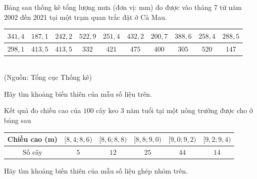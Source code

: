 \begin{bt}[Mức độ 1]%
	Bảng sau thống kê tổng lượng mưa (đơn vị: mm) đo được vào tháng 7 từ năm 2002 đến 2021 tại một trạm quan trắc đặt ở Cà Mau.
	\begin{center}
		\begin{tabular}{|c|c|c|c|c|c|c|c|c|c|}
			\hline
			$341{,}4$ & $187{,}1$ & $242{,}2$ & $522{,}9$ & $251{,}4$ & $432{,}2$ & $200{,}7$ & $388{,}6$ & $258{,}4$ & $288{,}5$ \\
			\hline
			$298{,}1$ & $413{,}5$ & $413{,}5$ & $332$ & $421$ & $475$ & $400$ & $305$ & $520$ & $147$ \\
			\hline
		\end{tabular}\\
		(Nguồn: Tổng cục Thống kê)
	\end{center}
	Hãy tìm khoảng biến thiên của mẫu số liệu trên.
\end{bt}

\begin{bt}[Mức độ 1]%
	Kết quả đo chiều cao của $100$ cây keo 3 năm tuổi tại một nông trường được cho ở bảng sau
	\begin{center}
		\begin{tabular}{|c|c|c|c|c|c|}
			\hline
			Chiều cao (m) & $[8{,}4;8{,}6)$ & $[8{,}6;8{,}8)$ & $[8{,}8;9{,}0)$ & $[9{,}0;9{,}2)$ & $[9{,}2;9{,}4)$ \\
			\hline
			Số cây & $5$ & $12$ & $25$ & $44$ & $14$ \\
			\hline
		\end{tabular}
	\end{center}
	Hãy tìm khoảng biến thiên của mẫu số liệu ghép nhóm trên.
\end{bt}

